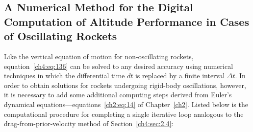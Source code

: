 \subsection{A Numerical Method for the Digital Computation of Altitude Performance in Cases of
Oscillating Rockets}\label{ch4:sec:4.2}

Like the vertical equation of motion for non-oscillating rockets, equation~\eqref{ch4:eq:136} can
be solved to any desired accuracy using numerical techniques in which the differential time $dt$
is replaced by a finite interval $\Delta t$. In order to obtain solutions for rockets undergoing
rigid-body oscillations, however, it is necessary to add some additional computing steps derived
from Euler's dynamical equations---equations~\eqref{ch2:eq:14} of Chapter~\ref{ch2}. Listed below
is the computational procedure for completing a single iterative loop analogous to the
drag-from-prior-velocity method of Section~\ref{ch4:sec:2.4}:
